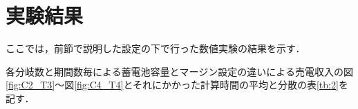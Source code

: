 \documentclass[a4paper,12pt,showkeys]{jreport}
\begin{document}
\section{実験結果}

ここでは，前節で説明した設定の下で行った数値実験の結果を示す．

各分岐数と期間数毎による蓄電池容量とマージン設定の違いによる売電収入の図\ref{fig:C2_T3}～図\ref{fig:C4_T4}とそれにかかった計算時間の平均と分散の表\ref{tb:2}を記す．



\end{document}
